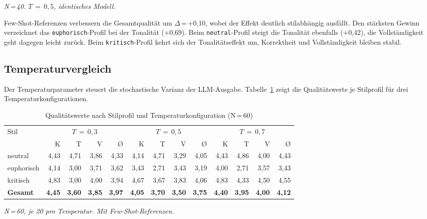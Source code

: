 \emph{N\,=\,40. $T\,=\,0{,}5$, identisches Modell.}

Few-Shot-Referenzen verbessern die Gesamtqualität um $\Delta$\,=\,+0{,}10, wobei der Effekt deutlich stilabhängig ausfällt. Den stärksten Gewinn verzeichnet das \texttt{euphorisch}-Profil bei der Tonalität (+0{,}69). Beim \texttt{neutral}-Profil steigt die Tonalität ebenfalls (+0{,}42), die Vollständigkeit geht dagegen leicht zurück. Beim \texttt{kritisch}-Profil kehrt sich der Tonalitätseffekt um, Korrektheit und Vollständigkeit bleiben stabil.

\subsection{Temperaturvergleich}\label{temperaturvergleich}

Der Temperaturparameter steuert die stochastische Varianz der LLM-Ausgabe. Tabelle~\ref{tab:temperaturvergleich} zeigt die Qualitätswerte je Stilprofil für drei Temperaturkonfigurationen.

{\footnotesize
\begin{longtable}[]{@{}lrrrrrrrrrrrr@{}}
\caption{Qualitätswerte nach Stilprofil und Temperaturkonfiguration (N\,=\,60)}\label{tab:temperaturvergleich}\\
\toprule\noalign{}
Stil & \multicolumn{4}{c}{$T\,=\,0{,}3$} & \multicolumn{4}{c}{$T\,=\,0{,}5$} & \multicolumn{4}{c}{$T\,=\,0{,}7$} \\
     & K & T & V & Ø & K & T & V & Ø & K & T & V & Ø \\
\midrule\noalign{}
\endhead
\bottomrule\noalign{}
\endlastfoot
neutral    & 4{,}43 & 4{,}71 & 3{,}86 & 4{,}33 & 4{,}14 & 4{,}71 & 3{,}29 & 4{,}05 & 4{,}43 & 4{,}86 & 4{,}00 & 4{,}43 \\
euphorisch & 4{,}14 & 3{,}00 & 3{,}71 & 3{,}62 & 3{,}43 & 2{,}71 & 3{,}43 & 3{,}19 & 4{,}00 & 2{,}71 & 3{,}57 & 3{,}43 \\
kritisch   & 4{,}83 & 3{,}00 & 4{,}00 & 3{,}94 & 4{,}67 & 3{,}67 & 3{,}83 & 4{,}06 & 4{,}83 & 4{,}33 & 4{,}50 & 4{,}55 \\
\textbf{Gesamt} & \textbf{4{,}45} & \textbf{3{,}60} & \textbf{3{,}85} & \textbf{3{,}97} & \textbf{4{,}05} & \textbf{3{,}70} & \textbf{3{,}50} & \textbf{3{,}75} & \textbf{4{,}40} & \textbf{3{,}95} & \textbf{4{,}00} & \textbf{4{,}12} \\
\end{longtable}
}

\emph{N\,=\,60, je 20 pro Temperatur. Mit Few-Shot-Referenzen.}

